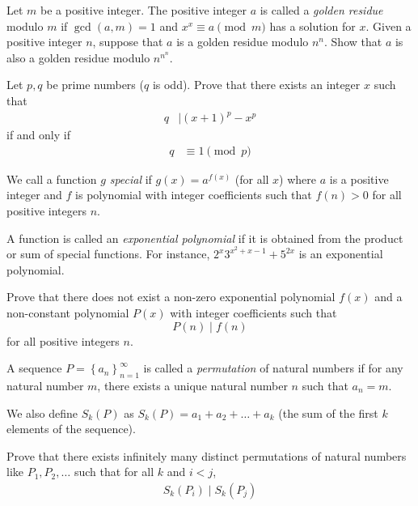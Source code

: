 \begin{problem}
	Let $m$ be a positive integer. The positive integer $a$ is called a \textit{golden residue} modulo $m$ if $\gcd(a,m)=1$ and $x^x \equiv a \pmod m$ has a solution for $x$. Given a positive integer $n$, suppose that $a$ is a golden residue modulo $n^n$. Show that $a$ is also a golden residue modulo $n^{n^n}$. %
\end{problem}

\begin{problem}
	Let $p,q$ be prime numbers ($q$ is odd). Prove that there exists an integer $x$ such that
		\begin{align*}
			q
				& \mid (x+1)^p-x^p
		\end{align*}
	if and only if
		\begin{align*}
			q
				& \equiv 1 \pmod p
		\end{align*}
\end{problem}

\begin{problem}
	We call a function $g$ \textit{special} if $g(x)=a^{f(x)}$ (for all $x$) where $a$ is a positive integer and $f$ is polynomial with integer coefficients such that $f(n)>0$ for all positive integers $n$.

	A function is called an \textit{exponential polynomial} if it is obtained from the product or sum of special functions. For instance, $2^{x}3^{x^{2}+x-1}+5^{2x}$ is an exponential polynomial.

	Prove that there does not exist a non-zero exponential polynomial $f(x)$ and a non-constant polynomial $P(x)$ with integer coefficients such that
	$$P(n)\mid f(n)$$for all positive integers $n$. %
\end{problem}

\begin{problem}
	A sequence $P=\left \{ a_{n} \right \}_{n=1}^{\infty}$ is called a \textit{permutation} of natural numbers if for any natural number $m$, there exists a unique natural number $n$ such that $a_n=m.$

	We also define $S_k(P)$ as
	$S_k(P)=a_{1}+a_{2}+\dots +a_{k}$ (the sum of the first $k$ elements of the sequence).

	Prove that there exists infinitely many distinct permutations of natural numbers like $P_1,P_2, \dots$ such that for all $k$ and $i<j$,
		\begin{align*}
			S_k(P_i)\mid S_k(P_j)
		\end{align*}
\end{problem}


